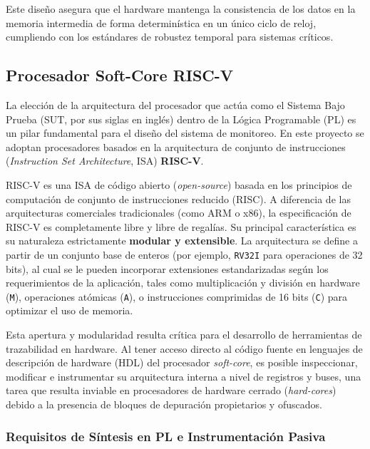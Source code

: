 Este diseño asegura que el hardware mantenga la consistencia de los datos en la memoria intermedia de forma determinística en un único ciclo de reloj, cumpliendo con los estándares de robustez temporal para sistemas críticos.

\subsection{Procesador Soft-Core RISC-V}
\label{ssec:riscv}

La elección de la arquitectura del procesador que actúa como el Sistema Bajo Prueba (SUT, por sus siglas en inglés) dentro de la Lógica Programable (PL) es un pilar fundamental para el diseño del sistema de monitoreo. En este proyecto se adoptan procesadores basados en la arquitectura de conjunto de instrucciones (\textit{Instruction Set Architecture}, ISA) \textbf{RISC-V}.

RISC-V es una ISA de código abierto (\textit{open-source}) basada en los principios de computación de conjunto de instrucciones reducido (RISC). A diferencia de las arquitecturas comerciales tradicionales (como ARM o x86), la especificación de RISC-V es completamente libre y libre de regalías. Su principal característica es su naturaleza estrictamente \textbf{modular y extensible}. La arquitectura se define a partir de un conjunto base de enteros (por ejemplo, \texttt{RV32I} para operaciones de 32 bits), al cual se le pueden incorporar extensiones estandarizadas según los requerimientos de la aplicación, tales como multiplicación y división en hardware (\texttt{M}), operaciones atómicas (\texttt{A}), o instrucciones comprimidas de 16 bits (\texttt{C}) para optimizar el uso de memoria. 

Esta apertura y modularidad resulta crítica para el desarrollo de herramientas de trazabilidad en hardware. Al tener acceso directo al código fuente en lenguajes de descripción de hardware (HDL) del procesador \textit{soft-core}, es posible inspeccionar, modificar e instrumentar su arquitectura interna a nivel de registros y buses, una tarea que resulta inviable en procesadores de hardware cerrado (\textit{hard-cores}) debido a la presencia de bloques de depuración propietarios y ofuscados.

\subsubsection{Requisitos de Síntesis en PL e Instrumentación Pasiva}


